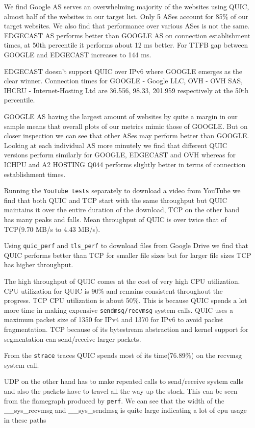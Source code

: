 \begin{frame}[allowframebreaks]
We find Google AS serves an overwhelming majority of the websites using QUIC, almost half of the websites in our target list. Only 5 ASes account for 85\% of our target websites. We also find that performance over various ASes is not the same. EDGECAST AS performs better than GOOGLE AS on connection establishment times, at 50th percentile it performs about 12 ms better. For TTFB gap between GOOGLE and EDGECAST increases to 144 ms. 

EDGECAST doesn't support QUIC over IPv6 where GOOGLE emerges as the clear winner. Connection times for GOOGLE - Google LLC, OVH - OVH SAS, IHCRU - Internet-Hosting Ltd are 36.556, 98.33, 201.959 respectively at the 50th percentile.

GOOGLE AS having the largest amount of websites by quite a margin in our sample means that overall plots of our metrics mimic those of GOOGLE. But on closer inspection we can see that other ASes may perform better than GOOGLE. Looking at each individual AS more minutely we find that different QUIC versions perform similarly for GOOGLE, EDGECAST and OVH whereas for ICHPU and A2 HOSTING Q044 performs slightly better in terms of connection establishment times.

Running the \texttt{YouTube tests} separately to download a video from YouTube we find that both QUIC and TCP start  with the same throughput but QUIC maintains it over the entire duration of the download, TCP on the other hand has many peaks and falls. Mean throughput of QUIC is over twice that of TCP(9.70 MB/s to 4.43 MB/s).

Using \texttt{quic\_perf} and \texttt{tls\_perf} to download files from Google Drive we find that QUIC performs better than TCP for smaller file sizes but for larger file sizes TCP has higher throughput.

The high throughput of QUIC comes at the cost of very high CPU utilization. CPU utilization for QUIC is 90\% and remains consistent throughout the progress. TCP CPU utilization is about 50\%.
This is because QUIC spends a lot more time in making expensive \texttt{sendmsg/recvmsg} system calls. QUIC uses a maximum packet size of 1350 for IPv4 and 1370 for IPv6 to avoid packet fragmentation. TCP because of its bytestream abstraction and kernel support for segmentation can send/receive larger packets.

From the \texttt{strace} traces QUIC spends most of its time(76.89\%) on the recvmsg system call. 

UDP on the other hand has to make repeated calls to send/receive system calls and also the packets have to travel all the way up the stack. This can be seen from the flamegraph produced by \texttt{perf}. We can see that the width of the \_\_sys\_recvmsg and \_\_sys\_sendmsg is quite large indicating a lot of cpu usage in these paths


\end{frame}
